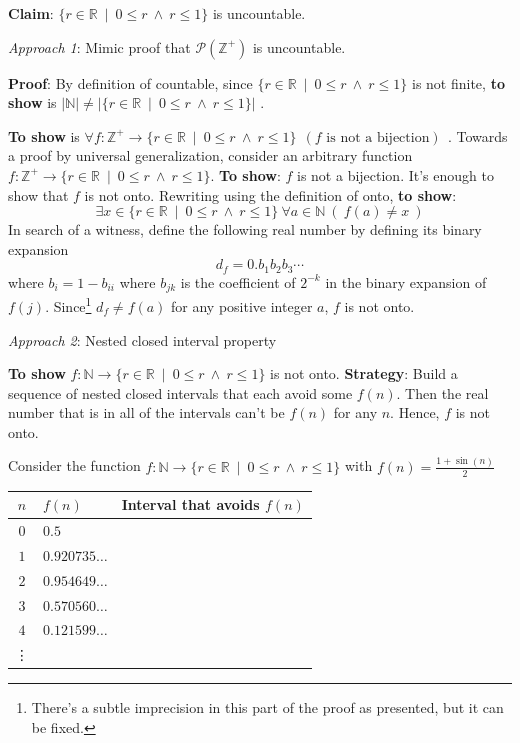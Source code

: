 \documentclass[12pt, oneside]{article}
\begin{document}
\newpage 

{\bf Claim}: $\{  r \in \mathbb{R} ~\mid~ 0 \leq r ~\wedge~ r \leq 1 \}$ is uncountable.

{\it Approach 1}: Mimic proof that $\mathcal{P}(\mathbb{Z}^+)$ is uncountable.


{\bf Proof}:  By definition of countable, since $\{  r \in \mathbb{R} ~\mid~ 0 \leq r ~\wedge~ r \leq 1 \}$
is not finite, {\bf to show} is $|\mathbb{N}| \neq  |\{  r \in \mathbb{R} ~\mid~ 0 \leq r ~\wedge~ r \leq 1 \}|$ .


{\bf To show} is
$\forall f : \mathbb{Z}^+ \to \{  r \in \mathbb{R} ~\mid~ 0 \leq r ~\wedge~ r \leq 1 \}  ~~(f \text{ is not a bijection})~~$.
Towards a proof by  universal generalization, consider  an arbitrary function 
$f:  \mathbb{Z}^+ \to \{  r \in \mathbb{R} ~\mid~ 0 \leq r ~\wedge~ r \leq 1 \}$.
{\bf To show}: $f$ is not a bijection.  It's enough to show that $f$ is not onto.
Rewriting using the definition of  onto, {\bf to show}:
\[
\exists x \in \{  r \in \mathbb{R} ~\mid~ 0 \leq r ~\wedge~ r \leq 1 \} ~\forall a \in \mathbb{N}  ~(~f(a) \neq  x~)
\]
In search of a witness, define the following  real number by defining its binary expansion
\[
d_f = 0.b_1 b_2 b_3 \cdots
\]
where $b_i = 1-b_{ii}$ where $b_{jk}$ is the coefficient of $2^{-k}$ in the binary expansion of $f(j)$.
Since\footnote{There's a subtle imprecision in this part of the proof as presented, but it can be fixed.} $d_f \neq f(a)$ for any positive integer $a$, $f$ is not onto.


{\it Approach 2}: Nested closed interval property

{\bf To show} $f: \mathbb{N} \to \{  r \in \mathbb{R} ~\mid~ 0  \leq r ~\wedge~ r \leq 1 \}$ is not onto. 
{\bf  Strategy}: Build
a sequence of nested closed intervals that each avoid some $f(n)$.   Then  the real
number that is in all of the intervals  can't be $f(n)$ for any $n$. Hence,  $f$ is not  onto.

Consider the function $f: \mathbb{N} \to \{  r \in \mathbb{R} ~\mid~ 0 \leq r ~\wedge~ r \leq 1 \}$ with  $f(n) = \frac{1+\sin(n)}{2}$

\begin{center}
\begin{tabular}{c||p{1.65in} || p{3in} }
$n$ &  $f(n)$& Interval that avoids $f(n)$ \\
\hline
$0$ & $0.5$ &  \\
$1$ &$0.920735\ldots$  &  \\
$2$ &$0.954649\ldots$ &  \\
$3$ &$0.570560\ldots$ & \\
$4$ &$0.121599\ldots $&  \\
\vdots &  &\\
\end{tabular}
\end{center}
  \vfill
\end{document}
